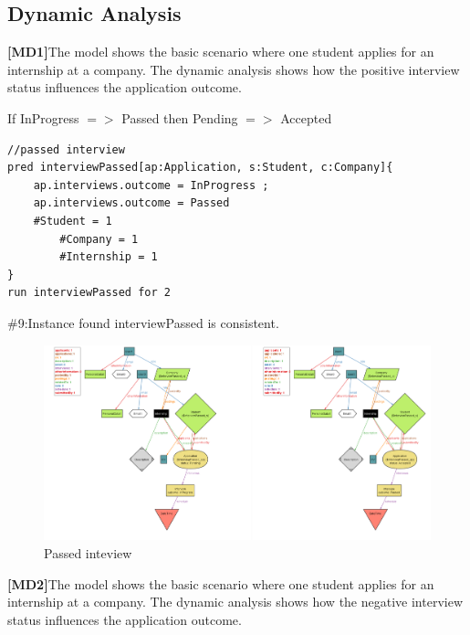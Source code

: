 \subsection{Dynamic Analysis}
\textbf{[MD1]}The model shows the basic scenario where one student applies for an internship
at a company. The dynamic analysis shows how the positive interview status influences the application outcome.

If InProgress $=>$ Passed then Pending $=>$ Accepted
\begin{lstlisting}
//passed interview
pred interviewPassed[ap:Application, s:Student, c:Company]{
	ap.interviews.outcome = InProgress ; 
	ap.interviews.outcome = Passed
	#Student = 1
    	#Company = 1
    	#Internship = 1
}
run interviewPassed for 2  
\end{lstlisting}
{ \#9:Instance found interviewPassed is consistent.}
\begin{figure}[H]
    \centering
    \includegraphics[width=1\linewidth]{RASD//Images/passed.png}
    \caption{Passed inteview}
    \label{fig:enter-label}
\end{figure}

\textbf{[MD2]}The model shows the basic scenario where one student applies for an internship
at a company. The dynamic analysis shows how the negative interview status influences the application outcome.

